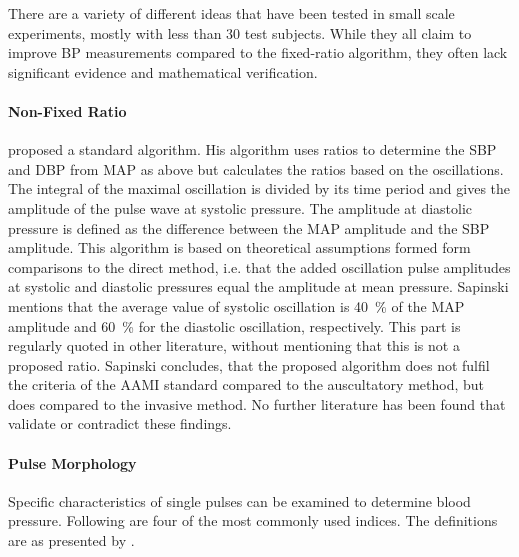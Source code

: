 There are a variety of different ideas that have been tested in small scale experiments, mostly with less than 30 test subjects. While they all claim to improve BP measurements compared to the fixed-ratio algorithm, they often lack significant evidence and mathematical verification.


\paragraph{Non-Fixed Ratio} \citet{Sapinski1996} proposed a standard algorithm. His algorithm uses ratios to determine the SBP and DBP from MAP as above but calculates the ratios based on the oscillations. The integral of the maximal oscillation is divided by its time period and gives the amplitude of the pulse wave at systolic pressure. The amplitude at diastolic pressure is defined as the difference between the MAP amplitude and the SBP amplitude. This algorithm is based on theoretical assumptions formed form comparisons to the direct method, i.e. that the added oscillation pulse amplitudes at systolic and diastolic pressures equal the amplitude at mean pressure. Sapinski mentions that the average value of systolic oscillation is \SI{40}{\%} of the MAP amplitude and \SI{60}{\%} for the diastolic oscillation, respectively. This part is regularly quoted in other literature, without mentioning that this is not a proposed ratio. Sapinski concludes, that the proposed algorithm does not fulfil the criteria of the AAMI standard compared to the auscultatory method, but does compared to the invasive method. No further literature has been found that validate or contradict these findings.


\paragraph{Pulse Morphology} Specific characteristics of single pulses can be examined to determine blood pressure. Following are four of the most commonly used indices. The definitions are as presented by \citet{Mafi2011}.


